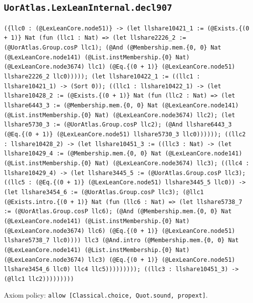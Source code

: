 \documentclass[11pt]{article}
\begin{document}
\subsection*{\texttt{UorAtlas.LexLeanInternal.decl907}}
\noindent\texttt{(\{llc0 : (@LexLeanCore.node51)\} -> (let llshare10421\_1 := (@Exists.\{(0 + 1)\} Nat (fun (llc1 : Nat) => (let llshare2226\_2 := (@UorAtlas.Group.cosP llc1); (@And (@Membership.mem.\{0, 0\} Nat (@LexLeanCore.node141) (@List.instMembership.\{0\} Nat) (@LexLeanCore.node3674) llc1) (@Eq.\{(0 + 1)\} (@LexLeanCore.node51) llshare2226\_2 llc0))))); (let llshare10422\_1 := ((llc1 : llshare10421\_1) -> (Sort 0)); ((llc1 : llshare10422\_1) -> (let llshare10428\_2 := (@Exists.\{(0 + 1)\} Nat (fun (llc2 : Nat) => (let llshare6443\_3 := (@Membership.mem.\{0, 0\} Nat (@LexLeanCore.node141) (@List.instMembership.\{0\} Nat) (@LexLeanCore.node3674) llc2); (let llshare5730\_3 := (@UorAtlas.Group.cosP llc2); (@And llshare6443\_3 (@Eq.\{(0 + 1)\} (@LexLeanCore.node51) llshare5730\_3 llc0)))))); ((llc2 : llshare10428\_2) -> (let llshare10451\_3 := ((llc3 : Nat) -> (let llshare10429\_4 := (@Membership.mem.\{0, 0\} Nat (@LexLeanCore.node141) (@List.instMembership.\{0\} Nat) (@LexLeanCore.node3674) llc3); ((llc4 : llshare10429\_4) -> (let llshare3445\_5 := (@UorAtlas.Group.cosP llc3); ((llc5 : (@Eq.\{(0 + 1)\} (@LexLeanCore.node51) llshare3445\_5 llc0)) -> (let llshare3454\_6 := (@UorAtlas.Group.cosP llc3); (@llc1 (@Exists.intro.\{(0 + 1)\} Nat (fun (llc6 : Nat) => (let llshare5738\_7 := (@UorAtlas.Group.cosP llc6); (@And (@Membership.mem.\{0, 0\} Nat (@LexLeanCore.node141) (@List.instMembership.\{0\} Nat) (@LexLeanCore.node3674) llc6) (@Eq.\{(0 + 1)\} (@LexLeanCore.node51) llshare5738\_7 llc0)))) llc3 (@And.intro (@Membership.mem.\{0, 0\} Nat (@LexLeanCore.node141) (@List.instMembership.\{0\} Nat) (@LexLeanCore.node3674) llc3) (@Eq.\{(0 + 1)\} (@LexLeanCore.node51) llshare3454\_6 llc0) llc4 llc5))))))))); ((llc3 : llshare10451\_3) -> (@llc1 llc2)))))))))}\par
\noindent Axiom policy: \texttt{allow [Classical.choice, Quot.sound, propext]}.\par
\end{document}
